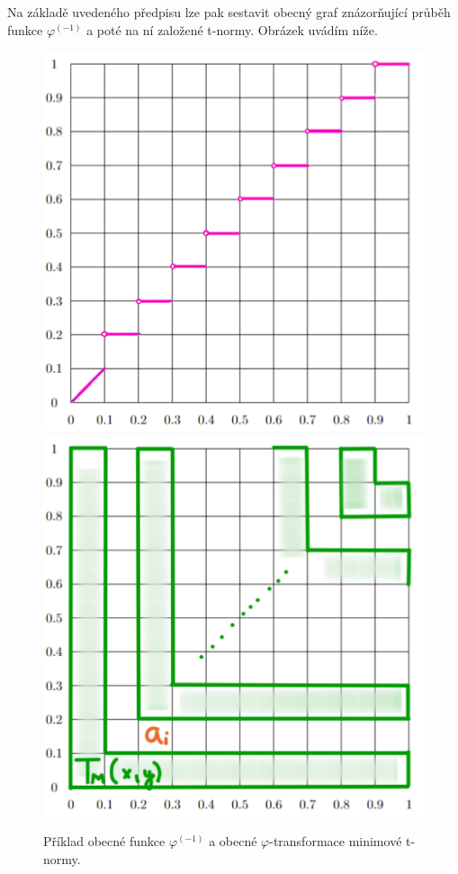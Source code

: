Na základě uvedeného předpisu lze pak sestavit obecný graf znázor\v nující pr\r uběh funkce $\varphi^{(-1)}$ a poté na ní založené t-normy. Obrázek uvádím níže.

\medskip

\begin{figure}[H]
\caption{ Příklad obecné funkce $\varphi^{(-1)}$ a obecné $\varphi$-transformace minimové t-normy.\\}
                \centering
        \includegraphics[scale=0.50]{template-fig/basic.pdf}
        \centering
        \includegraphics[scale=0.50]{template-fig/t-norma.pdf}
            \end{figure}
\medskip

